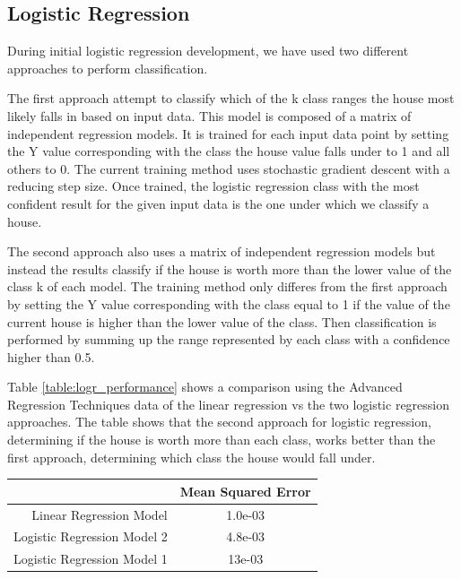 \documentclass[10pt]{article}
\begin{document}
\begin{multicols}{2}
		\subsection{Logistic Regression}
			During initial logistic regression development, we have used two different approaches to perform classification.
		\par
			The first approach attempt to classify which of the k class ranges the house most likely falls in based on input data. This model is composed of a matrix of independent regression models. It is trained for each input data point by setting the Y value corresponding with the class the house value falls under to 1 and all others to 0. The current training method uses stochastic gradient descent with a reducing step size. Once trained, the logistic regression class with the most confident result for the given input data is the one under which we classify a house.
		\par
	 		The second approach also uses a matrix of independent regression models but instead the results classify if the house is worth more than the lower value of the class k of each model. The training method only differes from the first approach by setting the Y value corresponding with the class equal to 1 if the value of the current house is higher than the lower value of the class. Then classification is performed by summing up the range represented by each class with a confidence higher than 0.5.
		\par
 			Table \ref{table:logr_performance} shows a comparison using the Advanced Regression Techniques data of the linear regression vs the two logistic regression approaches. The table shows that the second approach for logistic regression, determining if the house is worth more than each class, works better than the first approach, determining which class the house would fall under.
		\par
        	\captionsetup{type=table}
			\begin{tabular}{r|c}
				& \small{Mean Squared Error} \\
				\hline
				\small{Linear Regression Model} & \small{1.0e-03} \\
				\hline
				\small{Logistic Regression Model 2} & \small{4.8e-03} \\
				\hline
				\small{Logistic Regression Model 1} & \small{13e-03} \\
				\hline
			\end{tabular}

\end{multicols}
\end{document}
